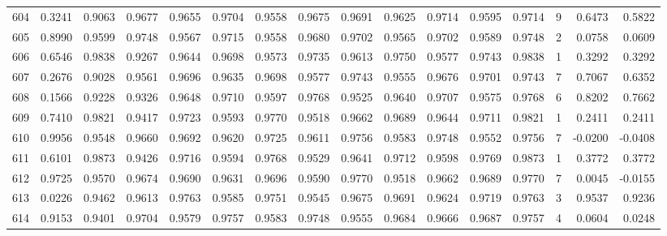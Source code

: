 \begin{tabular}{lrrrrrrrrrrrrrrr}
604 &      0.3241 &  0.9063 &  0.9677 &  0.9655 &  0.9704 &  0.9558 &  0.9675 &  0.9691 &  0.9625 &  0.9714 &   0.9595 &     0.9714 &      9 &                    0.6473 &                     0.5822 \\
605 &      0.8990 &  0.9599 &  0.9748 &  0.9567 &  0.9715 &  0.9558 &  0.9680 &  0.9702 &  0.9565 &  0.9702 &   0.9589 &     0.9748 &      2 &                    0.0758 &                     0.0609 \\
606 &      0.6546 &  0.9838 &  0.9267 &  0.9644 &  0.9698 &  0.9573 &  0.9735 &  0.9613 &  0.9750 &  0.9577 &   0.9743 &     0.9838 &      1 &                    0.3292 &                     0.3292 \\
607 &      0.2676 &  0.9028 &  0.9561 &  0.9696 &  0.9635 &  0.9698 &  0.9577 &  0.9743 &  0.9555 &  0.9676 &   0.9701 &     0.9743 &      7 &                    0.7067 &                     0.6352 \\
608 &      0.1566 &  0.9228 &  0.9326 &  0.9648 &  0.9710 &  0.9597 &  0.9768 &  0.9525 &  0.9640 &  0.9707 &   0.9575 &     0.9768 &      6 &                    0.8202 &                     0.7662 \\
609 &      0.7410 &  0.9821 &  0.9417 &  0.9723 &  0.9593 &  0.9770 &  0.9518 &  0.9662 &  0.9689 &  0.9644 &   0.9711 &     0.9821 &      1 &                    0.2411 &                     0.2411 \\
610 &      0.9956 &  0.9548 &  0.9660 &  0.9692 &  0.9620 &  0.9725 &  0.9611 &  0.9756 &  0.9583 &  0.9748 &   0.9552 &     0.9756 &      7 &                   -0.0200 &                    -0.0408 \\
611 &      0.6101 &  0.9873 &  0.9426 &  0.9716 &  0.9594 &  0.9768 &  0.9529 &  0.9641 &  0.9712 &  0.9598 &   0.9769 &     0.9873 &      1 &                    0.3772 &                     0.3772 \\
612 &      0.9725 &  0.9570 &  0.9674 &  0.9690 &  0.9631 &  0.9696 &  0.9590 &  0.9770 &  0.9518 &  0.9662 &   0.9689 &     0.9770 &      7 &                    0.0045 &                    -0.0155 \\
613 &      0.0226 &  0.9462 &  0.9613 &  0.9763 &  0.9585 &  0.9751 &  0.9545 &  0.9675 &  0.9691 &  0.9624 &   0.9719 &     0.9763 &      3 &                    0.9537 &                     0.9236 \\
614 &      0.9153 &  0.9401 &  0.9704 &  0.9579 &  0.9757 &  0.9583 &  0.9748 &  0.9555 &  0.9684 &  0.9666 &   0.9687 &     0.9757 &      4 &                    0.0604 &                     0.0248 \\

\end{tabular}
